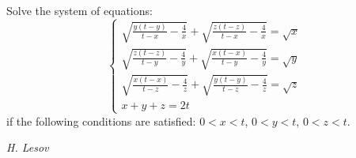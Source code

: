 Solve the system of equations:
$$\begin{cases}\sqrt{\frac{y(t-y)}{t-x}-\frac4x}+\sqrt{\frac{z(t-z)}{t-x}-\frac4x}=\sqrt x\\\sqrt{\frac{z(t-z)}{t-y}-\frac4y}+\sqrt{\frac{x(t-x)}{t-y}-\frac4y}=\sqrt y\\\sqrt{\frac{x(t-x)}{t-z}-\frac4z}+\sqrt{\frac{y(t-y)}{t-z}-\frac4z}=\sqrt z\\x+y+z=2t\end{cases}$$if the following conditions are satisfied: $0<x<t$, $0<y<t$, $0<z<t$.

\textit{H. Lesov}